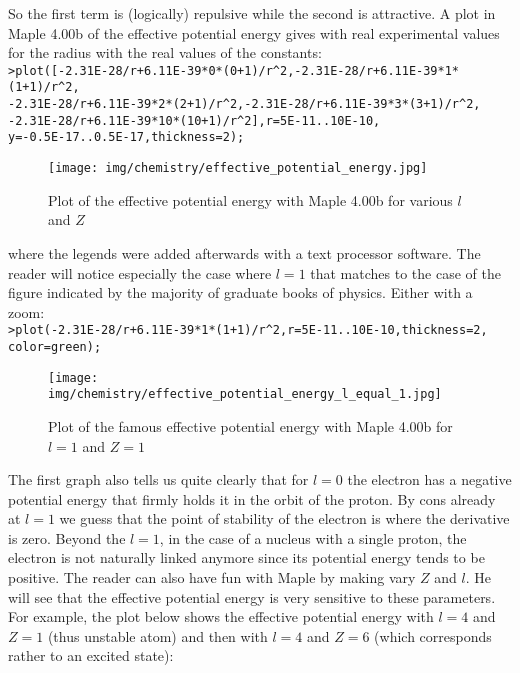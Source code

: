	So the first term is (logically) repulsive while the second is attractive. A plot in Maple 4.00b of the effective potential energy gives with real experimental values for the radius with the real values of the constants:\\
	
	\texttt{>plot([-2.31E-28/r+6.11E-39*0*(0+1)/r\string^2,-2.31E-28/r+6.11E-39*1*(1+1)/r\string^2,\\-2.31E-28/r+6.11E-39*2*(2+1)/r\string^2,-2.31E-28/r+6.11E-39*3*(3+1)/r\string^2,\\-2.31E-28/r+6.11E-39*10*(10+1)/r\string^2],r=5E-11..10E-10,\\y=-0.5E-17..0.5E-17,thickness=2);}
	\begin{figure}[H]
		\begin{center}
		\texttt{[image: img/chemistry/effective\_potential\_energy.jpg]}
		\end{center}	
		\caption{Plot of the effective potential energy with Maple 4.00b for various $l$ and $Z$}
	\end{figure}
	where the legends were added afterwards with a text processor software. The reader will notice especially the case where $l=1$ that matches to the case of the figure indicated by the majority of graduate books of physics. Either with a zoom:\\

	\texttt{>plot(-2.31E-28/r+6.11E-39*1*(1+1)/r\string^2,r=5E-11..10E-10,thickness=2, color=green);}
	\begin{figure}[H]
		\begin{center}
		\texttt{[image: img/chemistry/effective\_potential\_energy\_l\_equal\_1.jpg]}
		\end{center}	
		\caption{Plot of the famous effective potential energy with Maple 4.00b for  $l=1$ and $Z=1$}
	\end{figure}

	The first graph also tells us quite clearly that for $l= 0$ the electron has a negative potential energy that firmly holds it in the orbit of the proton. By cons already at $l= 1$ we guess that the point of stability of the electron is where the derivative is zero. Beyond the $l= 1$, in the case of a nucleus with a single proton, the electron is not naturally linked anymore since its potential energy tends to be positive. The reader can also have fun with Maple by making vary $Z$ and $l$. He will see that the effective potential energy is very sensitive to these parameters. For example, the plot below shows the effective potential energy with $l= 4$ and $Z = 1$ (thus unstable atom) and then with $l = 4$ and $Z = 6$ (which corresponds rather to an excited state):\\

